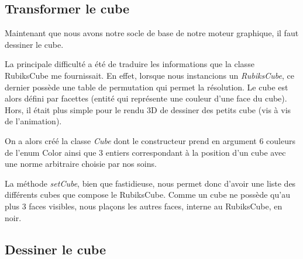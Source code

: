 \subsection{Transformer le cube}
Maintenant que nous avons notre socle de base de notre moteur graphique, il faut dessiner le cube.

La principale difficulté a été de traduire les informations que la classe RubiksCube me fournissait. En effet, lorsque nous instancions un \textit{RubiksCube}, ce dernier possède une table de permutation qui permet la résolution. Le cube est alors défini par facettes (entité qui représente une couleur d’une face du cube). Hors, il était plus simple pour le rendu 3D de dessiner des petits cube (vis à vis de l’animation).

On a alors créé la classe \textit{Cube} dont le constructeur prend en argument 6 couleurs de l’enum Color ainsi que 3 entiers correspondant à la position d’un cube avec une norme arbitraire choisie par nos soins.

La méthode \textit{setCube}, bien que fastidieuse, nous permet donc d’avoir une liste des différents cubes que compose le RubiksCube. Comme un cube ne possède qu’au plus 3 faces visibles, nous plaçons les autres faces, interne au RubiksCube, en noir.

\subsection{Dessiner le cube}
